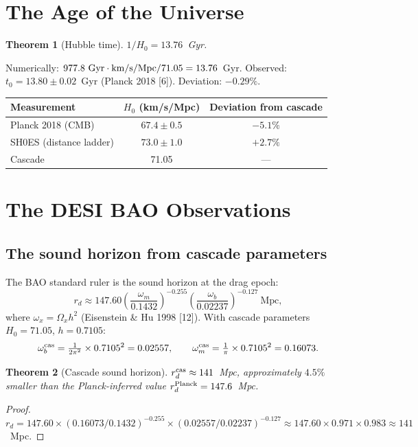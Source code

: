 \documentclass[12pt,a4paper]{article}
\newtheorem{theorem}{Theorem}[section]
\begin{document}
\section{The Age of the Universe}

\begin{theorem}[Hubble time]
$1/H_0 = 13.76$~Gyr.
\end{theorem}

Numerically: $977.8~{\rm Gyr\cdot km/s/Mpc}/71.05 = 13.76$~Gyr.
Observed: $t_0 = 13.80 \pm 0.02$~Gyr (Planck 2018 [6]). Deviation: $-0.29\%$.

\begin{center}
\begin{tabular}{lcc}
\hline
Measurement & $H_0$ (km/s/Mpc) & Deviation from cascade \\
\hline
Planck 2018 (CMB) & $67.4 \pm 0.5$ & $-5.1\%$ \\
SH0ES (distance ladder) & $73.0 \pm 1.0$ & $+2.7\%$ \\
Cascade & 71.05 & --- \\
\hline
\end{tabular}
\end{center}

\section{The DESI BAO Observations}

\subsection{The sound horizon from cascade parameters}

The BAO standard ruler is the sound horizon at the drag epoch:
\[
r_d \approx 147.60\left(\frac{\omega_m}{0.1432}\right)^{-0.255}
\left(\frac{\omega_b}{0.02237}\right)^{-0.127}~\text{Mpc},
\]
where $\omega_x = \Omega_x h^2$ (Eisenstein \& Hu 1998 [12]). With cascade parameters
$H_0 = 71.05$, $h = 0.7105$:
\[
\omega_b^{\rm cas} = \tfrac{1}{2\pi^2} \times 0.7105^2 = 0.02557,\qquad
\omega_m^{\rm cas} = \tfrac{1}{\pi} \times 0.7105^2 = 0.16073.
\]

\begin{theorem}[Cascade sound horizon]
$r_d^{\rm cas} \approx 141$~Mpc, approximately $4.5\%$ smaller than the Planck-inferred
value $r_d^{\rm Planck} = 147.6$~Mpc.
\end{theorem}

\begin{proof}
$r_d = 147.60 \times (0.16073/0.1432)^{-0.255} \times (0.02557/0.02237)^{-0.127}
\approx 147.60 \times 0.971 \times 0.983 \approx 141$~Mpc.
\end{proof}
\end{document}
